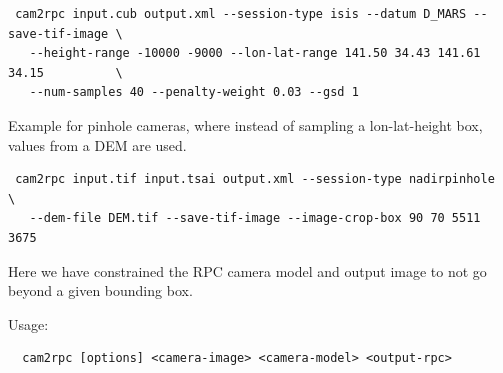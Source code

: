 \begin{verbatim}
 cam2rpc input.cub output.xml --session-type isis --datum D_MARS --save-tif-image \
   --height-range -10000 -9000 --lon-lat-range 141.50 34.43 141.61 34.15          \
   --num-samples 40 --penalty-weight 0.03 --gsd 1
\end{verbatim}

Example for pinhole cameras, where instead of sampling a lon-lat-height box,
values from a DEM are used.
\begin{verbatim}
 cam2rpc input.tif input.tsai output.xml --session-type nadirpinhole             \
   --dem-file DEM.tif --save-tif-image --image-crop-box 90 70 5511 3675
\end{verbatim}

Here we have constrained the RPC camera model and output image to not go beyond
a given bounding box. 

Usage:
\begin{verbatim}
  cam2rpc [options] <camera-image> <camera-model> <output-rpc>
\end{verbatim}

